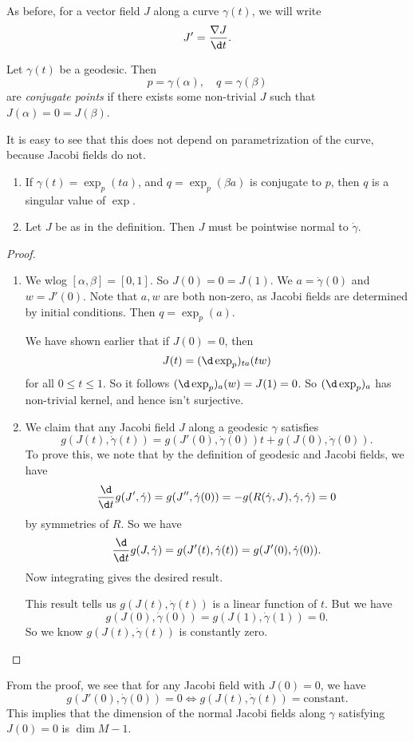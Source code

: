 \documentclass[a4paper]{article}
\begin{document}
As before, for a vector field $J$ along a curve $\gamma(t)$, we will write
\[
  J' = \frac{\nabla J}{\d t}.
\]
\begin{defi}
  Let $\gamma(t)$ be a geodesic. Then
  \[
    p = \gamma(\alpha), \quad q = \gamma(\beta)
  \]
  are \emph{conjugate points} if there exists some non-trivial $J$ such that $J(\alpha) = 0 = J(\beta)$.
\end{defi}
It is easy to see that this does not depend on parametrization of the curve, because Jacobi fields do not.

\begin{prop}\leavevmode
  \begin{enumerate}
    \item If $\gamma(t) = \exp_p(t a)$, and $q = \exp_p(\beta a)$ is conjugate to $p$, then $q$ is a singular value of $\exp$.
    \item Let $J$ be as in the definition. Then $J$ must be pointwise normal to $\dot{\gamma}$.
  \end{enumerate}
\end{prop}

\begin{proof}\leavevmode
  \begin{enumerate}
    \item We wlog $[\alpha, \beta] = [0, 1]$. So $J(0) = 0 = J(1)$. We $a = \dot{\gamma}(0)$ and $w = J'(0)$. Note that $a, w$ are both non-zero, as Jacobi fields are determined by initial conditions. Then $q = \exp_p(a)$.

      We have shown earlier that if $J(0) = 0$, then
      \[
        J(t) = (\d \exp_p)_{ta} (tw)
      \]
      for all $0 \leq t \leq 1$. So it follows $(\d \exp_p)_{a}(w) = J(1) = 0$. So $(\d \exp_p)_a$ has non-trivial kernel, and hence isn't surjective.
    \item We claim that any Jacobi field $J$ along a geodesic $\gamma$ satisfies
        \[
          g(J(t), \dot{\gamma}(t)) = g(J'(0), \dot{\gamma}(0)) t + g(J(0), \dot{\gamma}(0)).
        \]
      To prove this, we note that by the definition of geodesic and Jacobi fields, we have
      \[
        \frac{\d}{\d t} g(J', \dot{\gamma}) = g(J'', \dot{\gamma}(0)) = -g(R(\dot{\gamma}, J), \dot{\gamma}, \dot{\gamma}) = 0
      \]
      by symmetries of $R$. So we have
      \[
        \frac{\d}{\d t} g(J, \dot{\gamma}) = g(J'(t), \dot{\gamma}(t)) = g(J'(0), \dot{\gamma}(0)).
      \]
      Now integrating gives the desired result.

     This result tells us $g(J(t), \dot{\gamma}(t))$ is a linear function of $t$. But we have
      \[
        g(J(0), \dot{\gamma}(0)) = g(J(1), \dot{\gamma}(1)) = 0.
      \]
      So we know $g(J(t), \dot{\gamma}(t))$ is constantly zero.
  \end{enumerate}
\end{proof}
From the proof, we see that for any Jacobi field with $J(0) = 0$, we have
\[
  g(J'(0), \dot{\gamma}(0)) = 0 \Longleftrightarrow g(J(t), \dot{\gamma}(t)) = \text{constant}.
\]
This implies that the dimension of the normal Jacobi fields along $\gamma$ satisfying $J(0) = 0$ is $\dim M - 1$.
\end{document}
